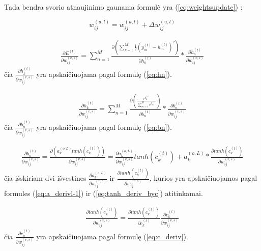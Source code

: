 Tada bendra svorio atnaujinimo gaunama formulė yra (\ref{eq:weightsupdate}) :

\begin{equation}\label{eq:weightsupdate}
  w_{ij}^{(u,l)} = w_{ij}^{(u,l)} + \Delta w_{ij}^{(u,l)}
\end{equation}

\begin{equation} \label{eq:E_deriv}
  \begin{aligned}
  \frac{\partial E^{(t)}}{\partial w_{ij}^{(v,s)}} = \sum_{n=1}^{M} \frac{\partial (\sum_{k=1}^{M} \frac{1}{2}(y_m^{(t)} - h_m^{(t)})^{2})}{\partial h_n^{(t)}} * \frac{\partial h_n^{(t)}}{\partial w_{ij}^{(v,s)}}
  \end{aligned}
\end{equation}
čia $\frac{\partial h_k^{(t)}}{\partial w_{ij}^{(v,s)}}$ yra apskaičiuojama pagal formulę (\ref{eq:hn}).


\begin{equation} \label{eq:hn}
  \begin{aligned}
  \frac{\partial h_k^{(t)}}{\partial w_{ij}^{(v,s)}}
  =
  \sum_{n=1}^{M}
  \frac{\partial (\frac{e^{b_k^{(t)}}}{\sum_{m=1}^{M} e^{b_m^{(t)}}})}
  {\partial b_n^{(t)}}
  *
   \frac{\partial b_n^{(t)}}{\partial w_{ij}^{(v,s)}}
   \end{aligned}
\end{equation}
čia $\frac{\partial b_n^{(t)}}{\partial w_{ij}^{(v,s)}}$ yra apskaičiuojama pagal formulę (\ref{eq:bn}).




\begin{equation} \label{eq:bn}
  \begin{aligned}
  \frac{\partial b_n^{(t)}}{\partial w_{ij}^{(v,s)}}
  =
  \frac{\partial (a_k^{(o,L)} tanh(c_k^{(t)}))}{\partial w_{ij}^{(v,s)}}
  =
  \frac{\partial a_k^{(o,L)}}{\partial w_{ij}^{(v,s)}} tanh(c_k^{(t)}) +
  a_k^{(o,L)} * \frac{\partial tanh(c_k^{(t)})}{\partial w_{ij}^{(v,s)}}
  \end{aligned}
\end{equation}
čia išskiriam dvi išvestines $\frac{\partial a_k^{(o,L)}}{\partial w_{ij}^{(v,s)}}$ ir $\frac{\partial tanh(c_k^{(t)})}{\partial w_{ij}^{(v,s)}}$, kurios yra apskaičiuojamos pagal formules (\ref{eq:a_derivl-1}) ir (\ref{eq:tanh_deriv_byc}) atitinkamai.


\begin{equation} \label{eq:tanh_deriv_byc}
  \begin{aligned}
  \frac{\partial tanh(c_k^{(t)})}{\partial w_{ij}^{(v,s)}} =
  \frac{\partial tanh(c_k^{(t)})}{\partial c_k^{(t)}}
  \frac{\partial c_k^{(t)}}{\partial w_{ij}^{(v,s)}}
  \end{aligned}
\end{equation}
čia $\frac{\partial c_k^{(t)}}{\partial w_{ij}^{(v,s)}}$ yra apskaičiuojama pagal formulę (\ref{eq:c_deriv}).


